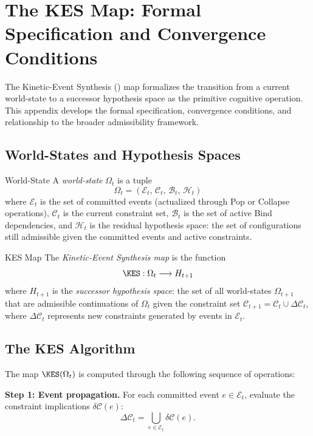 \chapter{The KES Map: Formal Specification and Convergence Conditions}
\label{app:kes}

\noindent The Kinetic-Event Synthesis (\KES) map formalizes the transition from
a current world-state to a successor hypothesis space as the primitive cognitive
operation. This appendix develops the formal specification, convergence conditions,
and relationship to the broader admissibility framework.

\section{World-States and Hypothesis Spaces}

\begin{definition}{World-State}
A \emph{world-state} $\Omega_t$ is a tuple
\[
  \Omega_t = (\mathcal{E}_t,\, \mathcal{C}_t,\, \mathcal{B}_t,\, \mathcal{H}_t)
\]
where $\mathcal{E}_t$ is the set of committed events (actualized through Pop or
Collapse operations), $\mathcal{C}_t$ is the current constraint set, $\mathcal{B}_t$
is the set of active Bind dependencies, and $\mathcal{H}_t$ is the residual
hypothesis space: the set of configurations still admissible given the committed
events and active constraints.
\end{definition}

\begin{definition}{KES Map}
The \emph{Kinetic-Event Synthesis map} is the function
\[
  \KES: \Omega_t \longrightarrow H_{t+1}
\]
where $H_{t+1}$ is the \emph{successor hypothesis space}: the set of all
world-states $\Omega_{t+1}$ that are admissible continuations of $\Omega_t$
given the constraint set $\mathcal{C}_{t+1} = \mathcal{C}_t \cup \Delta\mathcal{C}_t$,
where $\Delta\mathcal{C}_t$ represents new constraints generated by events in
$\mathcal{E}_t$.
\end{definition}

\section{The KES Algorithm}

The map $\KES(\Omega_t)$ is computed through the following sequence of operations:

\textbf{Step 1: Event propagation.} For each committed event $e \in \mathcal{E}_t$,
evaluate the constraint implications $\delta\mathcal{C}(e)$:
\[
  \Delta\mathcal{C}_t = \bigcup_{e \in \mathcal{E}_t} \delta\mathcal{C}(e).
\]

